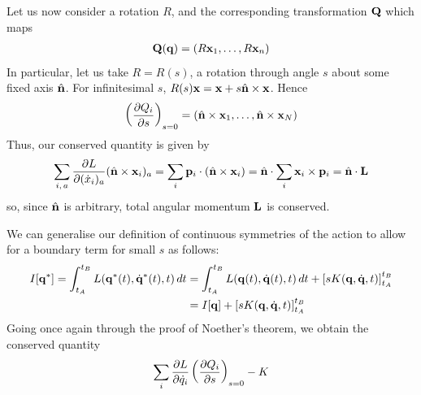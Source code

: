 \documentclass{../../template/note}
\begin{document}
    \begin{example*}
        Let us now consider a rotation $R$, and the corresponding transformation $\V Q$ which maps
        \begin{align*}
            \V Q(\V q) = (R \V x_1, \dots, R \V x_n)
        \end{align*}
        In particular, let us take $R = R(s)$, a rotation through angle $s$ about some fixed axis $\hvec n$. For infinitesimal $s$, $R(s) \V x = \V x + s \hvec n \times \V x$. Hence
        \begin{align*}
            \left(\pd{Q_i}{s}\right)_{s=0} = (\hvec n \times \V x_1, \dots, \hvec n \times \V x_N)
        \end{align*}
        Thus, our conserved quantity is given by
        \begin{align*}
            \sum_{i,\, a} \pd{L}{(\dot x_i)_a} (\hvec n \times \V x_i)_a = \sum_i \V p_i \cdot (\hvec n \times \V x_i) = \hvec n \cdot \sum_i \V x_i \times \V p_i = \hvec n \cdot \V L
        \end{align*}
        so, since $\hvec n$ is arbitrary, total angular momentum $\V L$ is conserved.       
    \end{example*}
    
    We can generalise our definition of continuous symmetries of the action to allow for a boundary term for small $s$ as follows:
    \begin{align*}
        I[\V q^*] = \int_{t_A}^{t_B} L(\V q^*(t), \dot{\V q}^*(t), t) \D t &= \int_{t_A}^{t_B} L(\V q(t), \dot{\V q}(t), t) \D t + \left[sK(\V q, \dot{\V q}, t)\right]_{t_A}^{t_B} \\
        &= I[\V q] + \left[sK(\V q, \dot{\V q}, t)\right]_{t_A}^{t_B}
    \end{align*}
    Going once again through the proof of Noether's theorem, we obtain the conserved quantity
    \begin{align*}
        \sum_i \pd{L}{\dot q_i} \left(\pd{Q_i}{s}\right)_{s=0}-K
    \end{align*}
    
\end{document}
